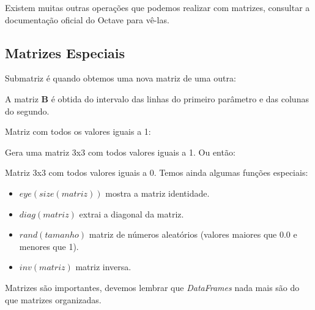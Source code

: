 \documentclass[a4paper,11pt]{article}
\begin{document}
Existem muitas outras operações que podemos realizar com matrizes, consultar a documentação oficial do Octave para vê-las.

\subsection{Matrizes Especiais}
Submatriz é quando obtemos uma nova matriz de uma outra: \\

A matriz \textbf{B} é obtida do intervalo das linhas do primeiro parâmetro e das colunas do segundo.

Matriz com todos os valores iguais a 1: \\

Gera uma matriz 3x3 com todos valores iguais a 1. Ou então: \\

Matriz 3x3 com todos valores iguais a 0. Temos ainda algumas funções especiais:
\begin{itemize}[nolistsep]
	\item $eye(size(matriz))$ mostra a matriz identidade.
	\item $diag(matriz)$ extrai a diagonal da matriz.
	\item $rand(tamanho)$ matriz de números aleatórios (valores maiores que 0.0 e menores que 1).
	\item $inv(matriz)$ matriz inversa.
\end{itemize}

Matrizes são importantes, devemos lembrar que \textit{DataFrames} nada mais são do que matrizes organizadas.
\end{document}
